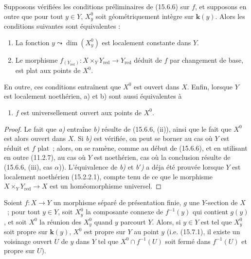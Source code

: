 \begin{corollary}[15.6.7]
\label{IV.15.6.7-fr}
Supposons vérifiées les conditions préliminaires de \textup{(15.6.6)} sur $f$, et supposons en outre que pour tout $y\in Y$, $X_y^0$ soit géométriquement intègre sur $\boldsymbol{k}(y)$. Alors les conditions suivantes sont équivalentes :
\begin{enumerate}[label=\emph{\alph*)}]
  \item La fonction $y\leadsto\dim(X_y^0)$ est localement constante dans $Y$.
  \item Le morphisme $f_{(Y_{\mathrm{red}})}:X\times_Y Y_{\mathrm{red}}\to Y_{\mathrm{red}}$ déduit de $f$ par changement de base, est plat aux points de $X^0$.
\end{enumerate}

En outre, ces conditions entraînent que $X^0$ est ouvert dans $X$. Enfin, lorsque $Y$ est localement noethérien, a) et b) sont aussi équivalentes à
\begin{enumerate}
  \item[\rm b$'$)] $f$ est universellement ouvert aux points de $X^0$.
\end{enumerate}
\end{corollary}

\begin{proof}
Le fait que \emph{a)} entraîne \emph{b)} résulte de (15.6.6, (ii)), ainsi que le fait que $X^0$ est alors ouvert dans $X$. Si \emph{b)} est vérifiée, on peut se borner au cas où $Y$ est réduit et $f$ plat~; alors, on se ramène, comme au début de (15.6.6), et en utilisant en outre (11.2.7), au cas où $Y$ est noethérien, cas où la conclusion résulte de (15.6.6, (iii), cas $\alpha$)). L'équivalence de \emph{b)} et \emph{b$'$)} a déja été prouvée lorsque $Y$ est localement noethérien (15.2.2.1), compte tenu de ce que le morphisme $X\times_Y Y_{\mathrm{red}}\to X$ est un homéomorphisme universel.
\end{proof}

\begin{proposition}[15.6.8]
\label{IV.15.6.8-fr}
Soient $f:X\to Y$ un morphisme séparé de présentation finie, $g$ une $Y$-section de $X$~; pour tout $y\in Y$, soit $X_y^0$ la composante connexe de $f^{-1}(y)$ qui contient $g(y)$, et soit $X^0$ la réunion des $X_y^0$ quand $y$ parcourt $Y$. Alors, si $y\in Y$ est tel que $X_y^0$ soit propre sur $\boldsymbol{k}(y)$, $X^0$ est propre sur $Y$ au point $y$ \textup{(i.e. (15.7.1), il existe un voisinage ouvert $U$ de $y$ dans $Y$ tel que $X^0\cap f^{-1}(U)$ soit fermé dans $f^{-1}(U)$ et propre sur $U$)}.
\end{proposition}

